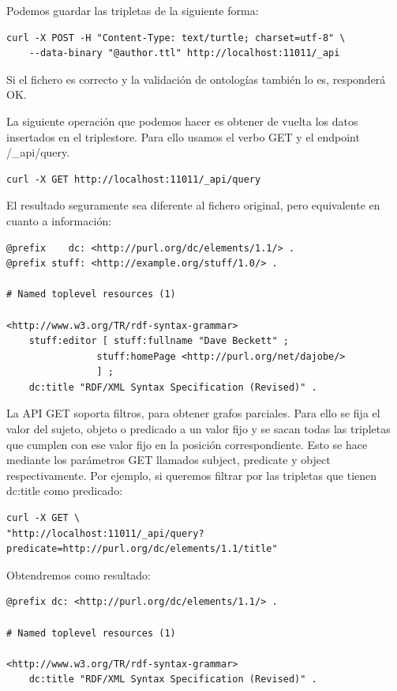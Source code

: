 \documentclass[openright,twoside,12pt]{book}
\begin{document}
Podemos guardar las tripletas de la siguiente forma:
\begin{verbatim}
curl -X POST -H "Content-Type: text/turtle; charset=utf-8" \
    --data-binary "@author.ttl" http://localhost:11011/_api
\end{verbatim}

Si el fichero es correcto y la validación de ontologías también lo es, responderá OK.

La siguiente operación que podemos hacer es obtener de vuelta los datos insertados en el triplestore. Para ello usamos el verbo GET y el endpoint /\_api/query.

\begin{verbatim}
curl -X GET http://localhost:11011/_api/query
\end{verbatim}

El resultado seguramente sea diferente al fichero original, pero equivalente en cuanto a información:

\begin{lstlisting}                                               
@prefix    dc: <http://purl.org/dc/elements/1.1/> .
@prefix stuff: <http://example.org/stuff/1.0/> .

# Named toplevel resources (1)

<http://www.w3.org/TR/rdf-syntax-grammar>
    stuff:editor [ stuff:fullname "Dave Beckett" ;
                stuff:homePage <http://purl.org/net/dajobe/>
                ] ;
    dc:title "RDF/XML Syntax Specification (Revised)" .
\end{lstlisting}

La API GET soporta filtros, para obtener grafos parciales. Para ello se fija el valor del sujeto, objeto o predicado a un valor fijo y se sacan todas las tripletas que cumplen con ese valor fijo en la posición correspondiente. Esto se hace mediante los parámetros GET llamados subject, predicate y object respectivamente. Por ejemplo, si queremos filtrar por las tripletas que tienen dc:title como predicado:

\begin{lstlisting}
curl -X GET \
"http://localhost:11011/_api/query?predicate=http://purl.org/dc/elements/1.1/title"
\end{lstlisting}

Obtendremos como resultado:

\begin{lstlisting}
@prefix dc: <http://purl.org/dc/elements/1.1/> .

# Named toplevel resources (1)

<http://www.w3.org/TR/rdf-syntax-grammar>
    dc:title "RDF/XML Syntax Specification (Revised)" .
\end{lstlisting}
\end{document}
